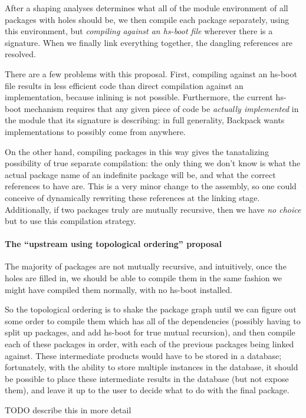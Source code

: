 \documentclass{article}
\begin{document}
After a shaping analyses determines what all of the module environment
of all packages with holes should be, we then compile each package separately,
using this environment, but \emph{compiling against an hs-boot file} wherever
there is a signature.  When we finally link everything together, the dangling
references are resolved.

There are a few problems with this proposal.  First, compiling against an
hs-boot file results in less efficient code than direct compilation against
an implementation, because inlining is not possible.  Furthermore, the current
hs-boot mechanism requires that any given piece of code be \emph{actually implemented}
in the module that its signature is describing: in full generality, Backpack
wants implementations to possibly come from anywhere.

On the other hand, compiling packages in this way gives the tanatalizing possibility
of true separate compilation: the only thing we don't know is what the actual
package name of an indefinite package will be, and what the correct references
to have are.  This is a very minor change to the assembly, so one could conceive
of dynamically rewriting these references at the linking stage.  Additionally,
if two packages truly are mutually recursive, then we have \emph{no choice} but
to use this compilation strategy.

\paragraph{The ``upstream using topological ordering'' proposal}
The majority of packages are not mutually recursive, and intuitively, once the
holes are filled in, we should be able to compile them in the same fashion
we might have compiled them normally, with no hs-boot installed.

So the topological ordering is to shake the package graph until we can
figure out some order to compile them which has all of the dependencies
(possibly having to split up packages, and add hs-boot for true mutual
recursion), and then compile each of these packages in order, with each
of the previous packages being linked against.  These intermediate
products would have to be stored in a database; fortunately, with the
ability to store multiple instances in the database, it should be
possible to place these intermediate results in the database (but not
expose them), and leave it up to the user to decide what to do with the
final package.

TODO describe this in more detail
\end{document}
